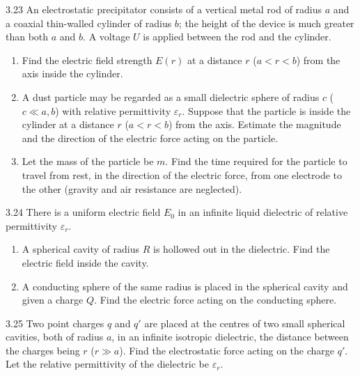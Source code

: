 \begin{problem}{3.23}
An electrostatic precipitator consists of a vertical metal rod of radius $a$ and a coaxial thin-walled cylinder of radius $b$; the height of the device is much greater than both $a$ and $b$. A voltage $U$ is applied between the rod and the cylinder.
\begin{enumerate}[label=(\arabic*),leftmargin=2.2em,itemsep=1pt,topsep=2pt]
\item Find the electric field strength $E(r)$ at a distance $r$ ($a<r<b$) from the axis inside the cylinder.
\item A dust particle may be regarded as a small dielectric sphere of radius $c$ ($c\ll a,b$) with relative permittivity $\varepsilon_r$. Suppose that the particle is inside the cylinder at a distance $r$ ($a<r<b$) from the axis. Estimate the magnitude and the direction of the electric force acting on the particle.
\item Let the mass of the particle be $m$. Find the time required for the particle to travel from rest, in the direction of the electric force, from one electrode to the other (gravity and air resistance are neglected).
\end{enumerate}
\end{problem}

\begin{problem}{3.24}
There is a uniform electric field $E_0$ in an infinite liquid dielectric of relative permittivity $\varepsilon_r$.
\begin{enumerate}[label=(\arabic*),leftmargin=2.2em,itemsep=1pt,topsep=2pt]
\item A spherical cavity of radius $R$ is hollowed out in the dielectric. Find the electric field inside the cavity.
\item A conducting sphere of the same radius is placed in the spherical cavity and given a charge $Q$. Find the electric force acting on the conducting sphere.
\end{enumerate}
\end{problem}

\begin{problem}{3.25}
Two point charges $q$ and $q'$ are placed at the centres of two small spherical cavities, both of radius $a$, in an infinite isotropic dielectric, the distance between the charges being $r$ ($r\gg a$). Find the electrostatic force acting on the charge $q'$. Let the relative permittivity of the dielectric be $\varepsilon_r$.
\end{problem}

